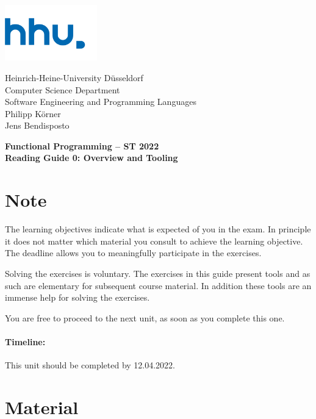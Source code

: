 \documentclass[11pt,a4paper]{article}
\begin{document}
	
\begin{minipage}[b]{\textwidth}
		\parbox[t]{5cm}{%
			\includegraphics[width=4cm]{unilogo}
			\hfill
		}
		\parbox[b]{11cm}{%
			Heinrich-Heine-University D\"usseldorf\\
			Computer Science Department\\
			Software Engineering and Programming Languages\\
        Philipp K\"orner \\
        Jens Bendisposto
}
		
\end{minipage}
	\begin{center}
		\bf
		Functional Programming -- ST 2022\\
		Reading Guide 0: Overview and Tooling
	\end{center}
	
	\pagestyle{empty}
	
	\section*{Note}
	The learning objectives indicate what is expected of you in the exam.
	In principle it does not matter which material you consult to achieve the learning objective.
	The deadline allows you to meaningfully participate in the exercises.
	
	Solving the exercises is voluntary.
	The exercises in this guide present tools and as such are elementary for subsequent course material.
	In addition these tools are an immense help for solving the exercises.
	
	You are free to proceed to the next unit, as soon as you complete this one.  
	
	\paragraph{Timeline:} This unit should be completed by 12.04.2022.
	
	\section{Material} 
	
\end{document}
